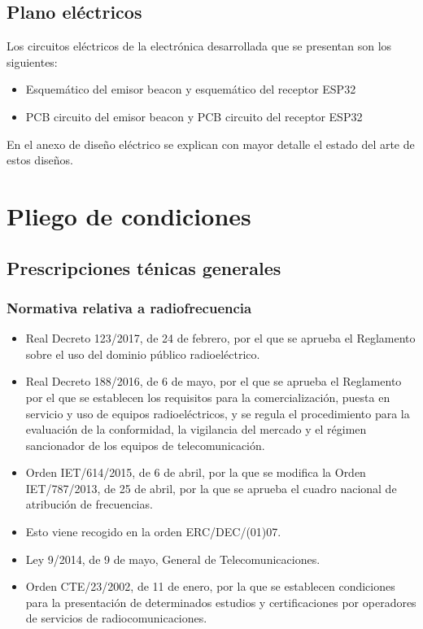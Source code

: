 \documentclass[paper=a4, fontsize=11pt,twoside]{scrartcl}	%
\begin{document}
    \subsection{Plano eléctricos}
        Los circuitos eléctricos de la electrónica desarrollada que se presentan son los siguientes:
        \begin{itemize}
            \item Esquemático del emisor beacon y esquemático del receptor ESP32
            \item PCB circuito del emisor beacon y PCB circuito del receptor ESP32
        \end{itemize}
        En el anexo de diseño eléctrico se explican con mayor detalle el estado del arte de estos diseños.
\section{Pliego de condiciones}
    \subsection{Prescripciones ténicas generales}
        \subsubsection{Normativa relativa a radiofrecuencia}
            \begin{itemize}
                \item Real Decreto 123/2017, de 24 de febrero, por el que se aprueba el Reglamento
                sobre el uso del dominio público radioeléctrico.
                \item Real Decreto 188/2016, de 6 de mayo, por el que se aprueba el Reglamento 
                por el que se establecen los requisitos para la comercialización, puesta en servicio 
                y uso de equipos radioeléctricos, y se regula el procedimiento para la evaluación de
                la conformidad, la vigilancia del mercado y el régimen sancionador de los equipos de
                telecomunicación.
                \item Orden IET/614/2015, de 6 de abril, por la que se modifica la Orden IET/787/2013,
                de 25 de abril, por la que se aprueba el cuadro nacional de atribución de frecuencias.
                \item Esto viene recogido en la orden ERC/DEC/(01)07.
                \item Ley 9/2014, de 9 de mayo, General de Telecomunicaciones.
                \item Orden CTE/23/2002, de 11 de enero, por la que se establecen condiciones para la presentación de determinados
                estudios y certificaciones por operadores de servicios de radiocomunicaciones. 
            \end{itemize}
\end{document}
